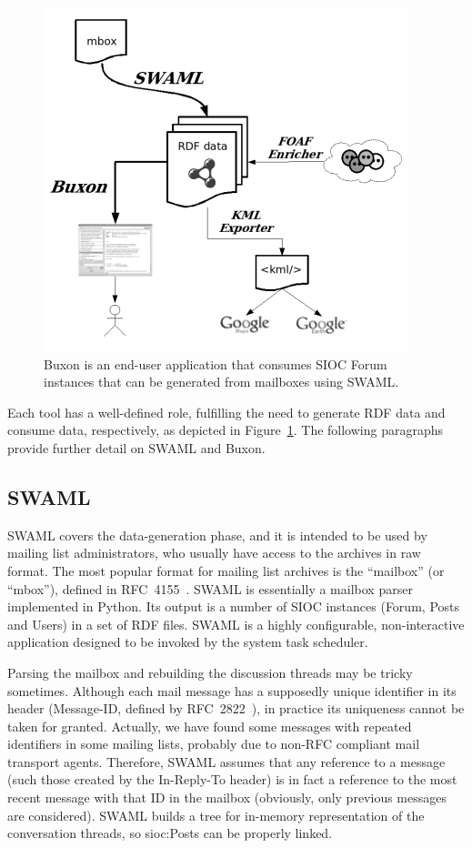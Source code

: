 \documentclass{llncs}
\begin{document}
\begin{figure}[ht]
 \centering
 \includegraphics[bb=0 0 300 283]{images/swaml.png}
 \caption{\label{fig:swaml-and-buxon}Buxon is an end-user application
that consumes SIOC
\textsf{Forum} instances that can be generated from mailboxes
using SWAML.}
\end{figure}

Each tool has a well-defined role, fulfilling the need to
generate RDF data and consume data, respectively, as depicted
in Figure~\ref{fig:swaml-and-buxon}. The following paragraphs
provide further detail on SWAML and Buxon.

\subsection{SWAML}

SWAML covers the data-generation phase, and it is intended to be
used by mailing list administrators, who usually have access to
the archives in raw format. The most popular format for
mailing list archives is the ``mailbox'' (or ``mbox''), defined
in RFC~4155~\cite{RFC4155}. SWAML is essentially a mailbox parser
implemented in Python. Its output is a number of SIOC instances
(\textsf{Forum}, \textsf{Post}s and \textsf{User}s) in a set
of RDF files. SWAML is a highly configurable, non-interactive
application designed to be invoked by the system task scheduler.

Parsing the mailbox and rebuilding the discussion threads may be
tricky sometimes. Although each mail message has a supposedly unique
identifier in its header (\textsf{Message-ID}, defined by
RFC~2822~\cite{RFC2822}), in practice its uniqueness cannot be
taken for granted. Actually, we have found some
messages with repeated identifiers in some mailing lists,
probably due to non-RFC compliant mail transport agents.
Therefore, SWAML assumes that any reference to a message
(such those created by the \textsf{In-Reply-To} header)
is in fact a reference to the most recent message with that ID
in the mailbox (obviously, only previous messages are
considered). SWAML builds a tree for in-memory representation
of the conversation threads, so \textsf{sioc:Post}s can be
properly linked.
\end{document}
